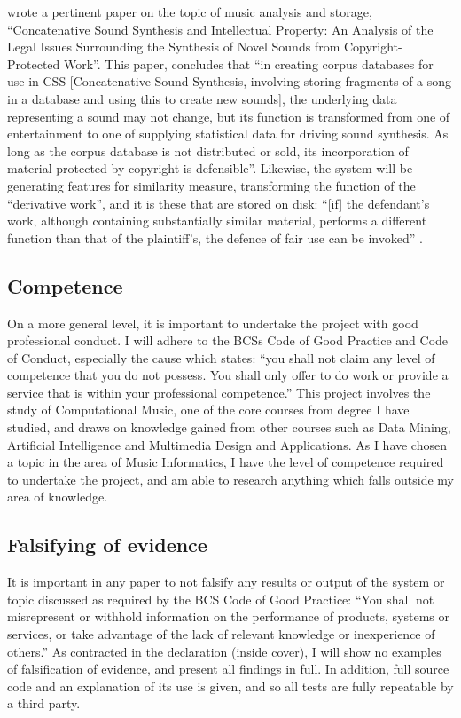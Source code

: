 \citet{Sturm2006} wrote a pertinent paper on the topic of music analysis and storage, ``Concatenative Sound Synthesis and Intellectual Property: An Analysis of the Legal Issues Surrounding the Synthesis of Novel Sounds from
Copyright-Protected Work''. This paper, concludes that
``in creating corpus databases for use in CSS [Concatenative Sound
Synthesis, involving storing fragments of a song in a database and
using this to create new sounds], the underlying data representing a
sound may not change, but its function is transformed from one of
entertainment to one of supplying statistical data for driving sound
synthesis. As long as the corpus database is not distributed or sold,
its incorporation of material protected by copyright is defensible''.
Likewise, the system will be generating features for similarity measure, transforming the function of the ``derivative work'', and it is these that are stored on disk: ``[if] the defendant's work, although containing
substantially similar material, performs a different function than that of the plaintiff's, the defence of fair use can be invoked'' \citep{Copyright1988}.
\subsection{Competence}
On a more general level, it is important to undertake the project with good professional conduct. I will adhere to the BCSs Code of Good Practice and Code of Conduct, especially the cause which states: ``you shall not claim any level of competence that you do not possess. You shall only offer to do work or provide a service that is within your professional competence.''
This project involves the study of Computational Music, one of the core courses
from degree I have studied, and draws on knowledge gained from other courses such as
Data Mining, Artificial Intelligence and Multimedia Design and Applications.
As I have chosen a topic in the area of Music Informatics, I have the level of
competence required to undertake the project, and am able to research anything
which falls outside my area of knowledge.
\subsection{Falsifying of evidence}
It is important in any paper to not falsify any results or output of the system or topic discussed as required by the BCS Code of Good Practice: ``You shall not misrepresent or withhold information on the performance of products, systems or services, or take advantage of the lack of relevant knowledge or inexperience of others.'' As contracted in the declaration (inside cover), I will show no examples of falsification of evidence, and present all findings in full. In addition, full source code and an explanation of its use is given, and so all tests are fully repeatable by a third party.
